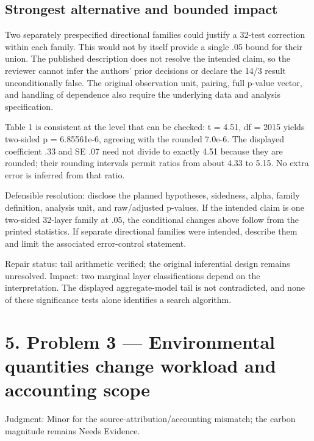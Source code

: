 \documentclass[10pt]{article}
\begin{document}
\subsection*{Strongest alternative and bounded impact}
Two separately prespecified directional families could justify a 32-test correction within each family. This would not by itself provide a single .05 bound for their union. The published description does not resolve the intended claim, so the reviewer cannot infer the authors’ prior decisions or declare the 14/3 result unconditionally false. The original observation unit, pairing, full p-value vector, and handling of dependence also require the underlying data and analysis specification.\par
Table 1 is consistent at the level that can be checked: t = 4.51, df = 2015 yields two-sided p = 6.85561e-6, agreeing with the rounded 7.0e-6. The displayed coefficient .33 and SE .07 need not divide to exactly 4.51 because they are rounded; their rounding intervals permit ratios from about 4.33 to 5.15. No extra error is inferred from that ratio.\par
Defensible resolution: disclose the planned hypotheses, sidedness, alpha, family definition, analysis unit, and raw/adjusted p-values. If the intended claim is one two-sided 32-layer family at .05, the conditional changes above follow from the printed statistics. If separate directional families were intended, describe them and limit the associated error-control statement.\par
Repair status: tail arithmetic verified; the original inferential design remains unresolved. Impact: two marginal layer classifications depend on the interpretation. The displayed aggregate-model tail is not contradicted, and none of these significance tests alone identifies a search algorithm.\par
\section*{5. Problem 3 — Environmental quantities change workload and accounting scope}
Judgment: Minor for the source-attribution/accounting mismatch; the carbon magnitude remains Needs Evidence.\par
\end{document}
